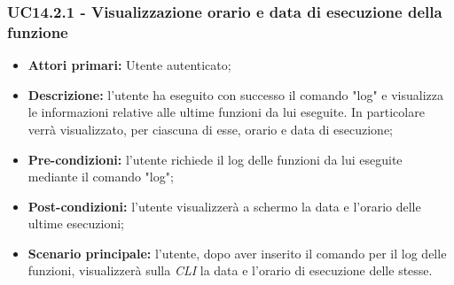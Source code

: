 \subsubsection{UC14.2.1 - Visualizzazione orario e data di esecuzione della funzione}
\begin{itemize}
	\item \textbf{Attori primari:} Utente autenticato;
	\item \textbf{Descrizione:} l'utente ha eseguito con successo il comando "log" e visualizza le informazioni relative alle ultime funzioni da lui eseguite. In particolare verrà visualizzato, per ciascuna di esse, orario e data di esecuzione;
	\item \textbf{Pre-condizioni:} l'utente richiede il log delle funzioni da lui eseguite mediante il comando "log";
	\item \textbf{Post-condizioni:} l'utente visualizzerà a schermo la data e l'orario delle ultime esecuzioni;
	\item \textbf{Scenario principale:} l'utente, dopo aver inserito il comando per il log delle funzioni, visualizzerà sulla \textit{CLI\glo} la data e l'orario di esecuzione delle stesse.
\end{itemize}
